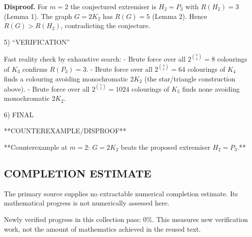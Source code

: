 \textbf{Disproof.}
For $m=2$ the conjectured extremiser is $H_2=P_3$ with $R(H_2)=3$ (Lemma 1). The graph $G=2K_2$ has $R(G)=5$ (Lemma 2). Hence $R(G)>R(H_2)$, contradicting the conjecture.

5) “VERIFICATION”

Fast reality check by exhaustive search:
- Brute force over all $2^{\binom{3}{2}}=8$ colourings of $K_3$ confirms $R(P_3)=3$.
- Brute force over all $2^{\binom{4}{2}}=64$ colourings of $K_4$ finds a colouring avoiding monochromatic $2K_2$ (the star/triangle construction above).
- Brute force over all $2^{\binom{5}{2}}=1024$ colourings of $K_5$ finds none avoiding monochromatic $2K_2$.

6) FINAL

**COUNTEREXAMPLE/DISPROOF**

**Counterexample at $m=2$: $G=2K_2$ beats the proposed extremiser $H_2=P_3$.**



\subsection*{COMPLETION ESTIMATE}
The primary source supplies no extractable numerical completion estimate. Its mathematical progress is not numerically assessed here.

Newly verified progress in this collection pass: $0\%$. This measures new verification work, not the amount of mathematics achieved in the reused text.
